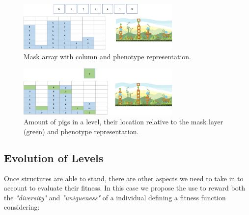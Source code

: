 \documentclass[conference]{IEEEtran}
\begin{document}
    \begin{figure}[htbp]
        \centerline{\includegraphics[width=80mm]{Images/mask_layer.png}}
        \caption{Mask array with column and phenotype representation.}
        \label{mask_layer}
    \end{figure}
    
    \begin{figure}[htbp]
        \centerline{\includegraphics[width=80mm]{Images/enemy_layer.png}}
        \caption{Amount of pigs in a level, their location relative to the mask layer
         (green) and phenotype representation.}
        \label{enemy_layer}
    \end{figure}
    
    \subsection{Evolution of Levels} 

    Once structures are able to stand, there are other aspects we need to take
    in to account to evaluate their fitness. In this case we propose the use to
    reward both the \textit{"diversity"} and \textit{"uniqueness"} of a
    individual defining a fitness function considering:
    
\end{document}
